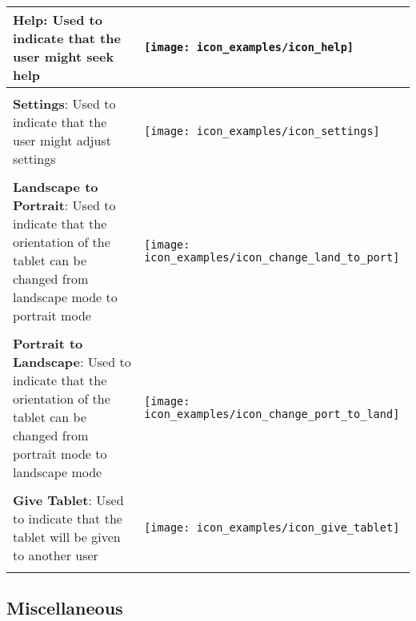 \begin{longtable}{m{\textwidth-2.2cm} m{1.5cm}}
	\textbf{Help}: Used to indicate that the user might seek help & \parbox[c]{1.2cm}{
	\texttt{[image: icon\_examples/icon\_help]}} \\[0.6cm] \hline \\[-0.6em]

	\textbf{Settings}: Used to indicate that the user might adjust settings & \parbox[c]{1.2cm}{
	\texttt{[image: icon\_examples/icon\_settings]}} \\[0.6cm] \hline \\[-0.6em]

	\textbf{Landscape to Portrait}: Used to indicate that the orientation of the tablet can be changed from landscape mode to portrait mode & \parbox[c]{1.2cm}{
	\texttt{[image: icon\_examples/icon\_change\_land\_to\_port]}} \\[0.6cm] \hline \\[-0.6em] 

	\textbf{Portrait to Landscape}: Used to indicate that the orientation of the tablet can be changed from portrait mode to landscape mode & \parbox[c]{1.2cm}{
	\texttt{[image: icon\_examples/icon\_change\_port\_to\_land]}} \\[0.6cm] \hline \\[-0.6em]

	\textbf{Give Tablet}: Used to indicate that the tablet will be given to another user & \parbox[c]{1.2cm}{
	\texttt{[image: icon\_examples/icon\_give\_tablet]}} \\[0.6cm] \hline \\[-0.6em]
\end{longtable}


\subsection{Miscellaneous}

